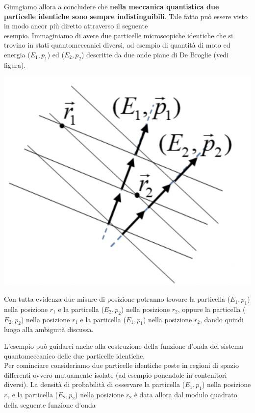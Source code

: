 Giungiamo allora a concludere che \textbf{nella meccanica quantistica
due particelle identiche sono sempre indistinguibili}.
Tale fatto può
essere visto in modo ancor più diretto attraverso il seguente\\
esempio.
Immaginiamo di avere due particelle microscopiche identiche che
si trovino in stati quantomeccanici diversi, ad esempio di quantità di
moto ed energia (\(E_1, p_1\)) ed (\(E_2, p_2\)) descritte da due onde
piane di De Broglie (vedi figura).\\
\begin{marginfigure}
    \includegraphics{figs/identical-part2}
    \label{fig:identical-part2}
\end{marginfigure}
Con tutta evidenza due misure di posizione potranno trovare la
particella (\(E_{1},p_{1}\)) nella posizione \(r_{1}\) e la particella
(\(E_{2},p_{2}\)) nella posizione \(r_{2}\), oppure la particella
(\(E_{2}, p_{2}\)) nella posizione \(r_{1}\) e la particella
(\(E_{1}, p_{1}\)) nella posizione \(r_{2}\), dando quindi luogo alla
ambiguità discussa.

L'esempio può guidarci anche alla costruzione della funzione d'onda del
sistema quantomeccanico delle due particelle identiche.\\
Per cominciare consideriamo due particelle identiche poste in regioni di
spazio differenti ovvero mutuamente isolate (ad esempio ponendole in
contenitori diversi).
La densità di probabilità di osservare la
particella (\(E_{1},p_{1}\)) nella posizione \(r_{1}\) e la particella
(\(E_{2},p_{2}\)) nella posizione \(r_{2}\) è data allora dal modulo
quadrato della seguente funzione d'onda

